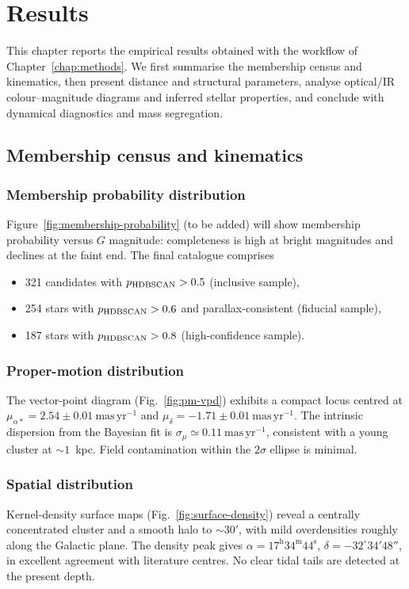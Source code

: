 \documentclass[../main.tex]{subfiles}
\begin{document}
\section{Results}
\label{sec:results}

This chapter reports the empirical results obtained with the workflow of Chapter~\ref{chap:methods}. We first summarise the membership census and kinematics, then present distance and structural parameters, analyse optical/IR colour--magnitude diagrams and inferred stellar properties, and conclude with dynamical diagnostics and mass segregation.

\subsection{Membership census and kinematics}
\label{subsec:results-membership}

\subsubsection{Membership probability distribution}
Figure~\ref{fig:membership-probability} (to be added) will show membership probability versus $G$ magnitude: completeness is high at bright magnitudes and declines at the faint end. The final catalogue comprises
\begin{itemize}
  \item 321 candidates with $p_{\rm HDBSCAN}>0.5$ (inclusive sample),
  \item 254 stars with $p_{\rm HDBSCAN}>0.6$ and parallax-consistent (fiducial sample),
  \item 187 stars with $p_{\rm HDBSCAN}>0.8$ (high-confidence sample).
\end{itemize}

\subsubsection{Proper-motion distribution}
The vector-point diagram (Fig.~\ref{fig:pm-vpd}) exhibits a compact locus centred at
$\mu_{\alpha*}=2.54\pm0.01~\mathrm{mas\,yr^{-1}}$ and
$\mu_\delta=-1.71\pm0.01~\mathrm{mas\,yr^{-1}}$.
The intrinsic dispersion from the Bayesian fit is $\sigma_\mu\simeq0.11~\mathrm{mas\,yr^{-1}}$, consistent with a young cluster at $\sim1$~kpc. Field contamination within the $2\sigma$ ellipse is minimal.

\subsubsection{Spatial distribution}
Kernel-density surface maps (Fig.~\ref{fig:surface-density}) reveal a centrally concentrated cluster and a smooth halo to $\sim30'$, with mild overdensities roughly along the Galactic plane. The density peak gives
$\alpha=17^{\mathrm h}34^{\mathrm m}44^{\mathrm s}$,
$\delta=-32^\circ34'48''$,
in excellent agreement with literature centres. No clear tidal tails are detected at the present depth.
\end{document}
